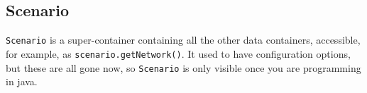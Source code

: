 

\subsection{Scenario}
\label{sec:extending-scenario}

\lstinline{Scenario} is a super-container containing all the other data containers, accessible, for example, as \lstinline{scenario.getNetwork()}.  It used to have configuration options, but these are all gone now, so \lstinline{Scenario} is only visible once you are programming in \gls{java}. 

